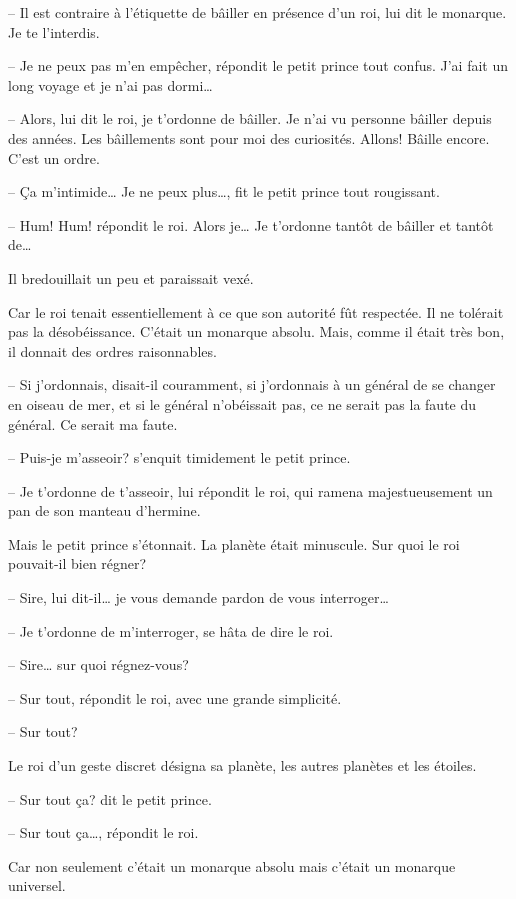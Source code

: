 \begin{Parallel}[p]{}{}
{-- Il est contraire à l'étiquette de bâiller en présence d'un roi, lui dit le monarque. Je te l'interdis.

-- Je ne peux pas m'en empêcher, répondit le
petit prince tout confus. J'ai fait un long voyage et je
n'ai pas dormi\ldots{}

-- Alors, lui dit le roi, je t'ordonne de bâiller. Je n'ai vu personne bâiller depuis des années. Les
bâillements sont pour moi des curiosités. Allons! Bâille encore. C'est un ordre.

-- Ça m'intimide\ldots{} Je ne peux plus\ldots{}, fit le petit
prince tout rougissant.

-- Hum! Hum! répondit le roi. Alors je\ldots{} Je t'ordonne tantôt de bâiller et tantôt de\ldots{}

Il bredouillait un peu et paraissait vexé.

Car le roi tenait essentiellement à ce que son
autorité fût respectée. Il ne tolérait pas la désobéissance. C'était un monarque absolu. Mais, comme il
était très bon, il donnait des ordres raisonnables.

-- Si j'ordonnais, disait-il couramment, si j'ordonnais à un général de se changer en oiseau de mer, et si le général n'obéissait pas, ce ne serait pas la faute du général. Ce serait ma faute.

-- Puis-je m'asseoir? s'enquit timidement le petit prince.

-- Je t'ordonne de t'asseoir, lui répondit le roi, qui ramena majestueusement un pan de son manteau d'hermine.

Mais le petit prince s'étonnait. La planète était
minuscule. Sur quoi le roi pouvait-il bien régner?

-- Sire, lui dit-il\ldots{} je vous demande pardon de
vous interroger\ldots{}

-- Je t'ordonne de m'interroger, se hâta de dire le roi.

-- Sire\ldots{} sur quoi régnez-vous?

-- Sur tout, répondit le roi, avec une grande simplicité.

-- Sur tout?

Le roi d'un geste discret désigna sa planète, les
autres planètes et les étoiles.

-- Sur tout ça? dit le petit prince.

-- Sur tout ça\ldots{}, répondit le roi.

Car non seulement c'était un monarque absolu mais c'était un monarque universel.

}
\end{Parallel}
